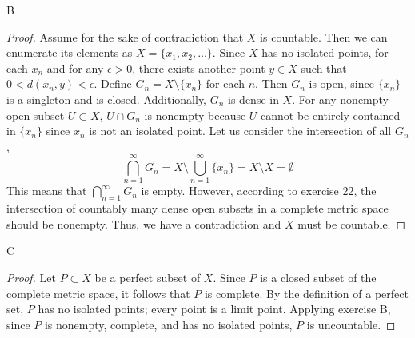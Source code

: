 \documentclass[11pt]{article}
\begin{document}
\begin{exercise}{24}
\begin{enumerate} [(a)]
    \end{enumerate}
\end{exercise}

\begin{exercise}{B}
    \begin{proof}
        Assume for the sake of contradiction that $X$ is countable. Then we can enumerate its elements as $X = \{ x_1, x_2, \dots \}$. Since $X$ has no isolated points, for each $x_n$ and for any $\epsilon > 0$, there exists another point $y \in X$ such that $0 < d(x_n, y) < \epsilon$. Define $G_n = X \setminus \{ x_n \}$ for each $n$. Then $G_n$ is open, since $\{ x_n \}$ is a singleton and is closed. Additionally, $G_n$ is dense in $X$. For any nonempty open subset $U \subset X$, $U \cap G_n$ is nonempty because $U$ cannot be entirely contained in $\{ x_n \} $ since $x_n$ is not an isolated point. Let us consider the intersection of all $G_n$, $$\bigcap_{n = 1}^\infty G_n = X \setminus \bigcup_{n = 1}^\infty \{ x_n \} = X \setminus X = \emptyset$$ This means that $\bigcap_{n=1}^\infty G_n$ is empty. However, according to exercise 22, the intersection of countably many dense open subsets in a complete metric space should be nonempty. Thus, we have a contradiction and $X$ must be countable. 
    \end{proof}
\end{exercise}

\begin{exercise}{C}
    \begin{proof}
        Let $P \subset X$ be a perfect subset of $X$. Since $P$ is a closed subset of the complete metric space, it follows that $P$ is complete. By the definition of a perfect set, $P$ has no isolated points; every point is a limit point. Applying exercise B, since $P$ is nonempty, complete, and has no isolated points, $P$ is uncountable. 
    \end{proof}
\end{exercise}
\end{document}
